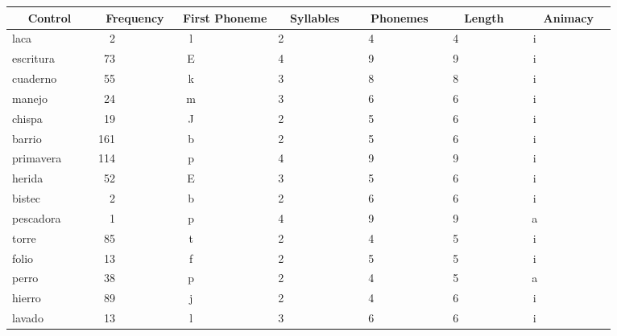 %
\setlongtables
\begin{longtable}{|l|c|c|c|c|c|c|}

\hline
\multicolumn{1}{|c|}{Control}&\multicolumn{1}{c|}{Frequency}&\multicolumn{1}{c|}{First Phoneme}&\multicolumn{1}{c|}{Syllables}&\multicolumn{1}{c|}{Phonemes}&\multicolumn{1}{c|}{Length}&\multicolumn{1}{c|}{Animacy}\\ \hline
\endhead
\hline\endfoot
laca~~~~~~~~~&~~2~~~~~~~~~~&l~~~~~~~~~~~~&2~~~~~~~~~~~~&~4~~~~~~~~~~~&~4~~~~~~~~~~~&i~~~~~~~~~~~~\\ 
escritura~~~~&~73~~~~~~~~~~&E~~~~~~~~~~~~&4~~~~~~~~~~~~&~9~~~~~~~~~~~&~9~~~~~~~~~~~&i~~~~~~~~~~~~\\ 
cuaderno~~~~~&~55~~~~~~~~~~&k~~~~~~~~~~~~&3~~~~~~~~~~~~&~8~~~~~~~~~~~&~8~~~~~~~~~~~&i~~~~~~~~~~~~\\ 
manejo~~~~~~~&~24~~~~~~~~~~&m~~~~~~~~~~~~&3~~~~~~~~~~~~&~6~~~~~~~~~~~&~6~~~~~~~~~~~&i~~~~~~~~~~~~\\ 
chispa~~~~~~~&~19~~~~~~~~~~&J~~~~~~~~~~~~&2~~~~~~~~~~~~&~5~~~~~~~~~~~&~6~~~~~~~~~~~&i~~~~~~~~~~~~\\ 
barrio~~~~~~~&161~~~~~~~~~~&b~~~~~~~~~~~~&2~~~~~~~~~~~~&~5~~~~~~~~~~~&~6~~~~~~~~~~~&i~~~~~~~~~~~~\\ 
primavera~~~~&114~~~~~~~~~~&p~~~~~~~~~~~~&4~~~~~~~~~~~~&~9~~~~~~~~~~~&~9~~~~~~~~~~~&i~~~~~~~~~~~~\\ 
herida~~~~~~~&~52~~~~~~~~~~&E~~~~~~~~~~~~&3~~~~~~~~~~~~&~5~~~~~~~~~~~&~6~~~~~~~~~~~&i~~~~~~~~~~~~\\ 
bistec~~~~~~~&~~2~~~~~~~~~~&b~~~~~~~~~~~~&2~~~~~~~~~~~~&~6~~~~~~~~~~~&~6~~~~~~~~~~~&i~~~~~~~~~~~~\\ 
pescadora~~~~&~~1~~~~~~~~~~&p~~~~~~~~~~~~&4~~~~~~~~~~~~&~9~~~~~~~~~~~&~9~~~~~~~~~~~&a~~~~~~~~~~~~\\ 
torre~~~~~~~~&~85~~~~~~~~~~&t~~~~~~~~~~~~&2~~~~~~~~~~~~&~4~~~~~~~~~~~&~5~~~~~~~~~~~&i~~~~~~~~~~~~\\ 
folio~~~~~~~~&~13~~~~~~~~~~&f~~~~~~~~~~~~&2~~~~~~~~~~~~&~5~~~~~~~~~~~&~5~~~~~~~~~~~&i~~~~~~~~~~~~\\ 
perro~~~~~~~~&~38~~~~~~~~~~&p~~~~~~~~~~~~&2~~~~~~~~~~~~&~4~~~~~~~~~~~&~5~~~~~~~~~~~&a~~~~~~~~~~~~\\ 
hierro~~~~~~~&~89~~~~~~~~~~&j~~~~~~~~~~~~&2~~~~~~~~~~~~&~4~~~~~~~~~~~&~6~~~~~~~~~~~&i~~~~~~~~~~~~\\ 
lavado~~~~~~~&~13~~~~~~~~~~&l~~~~~~~~~~~~&3~~~~~~~~~~~~&~6~~~~~~~~~~~&~6~~~~~~~~~~~&i~~~~~~~~~~~~\\ 

\end{longtable}
